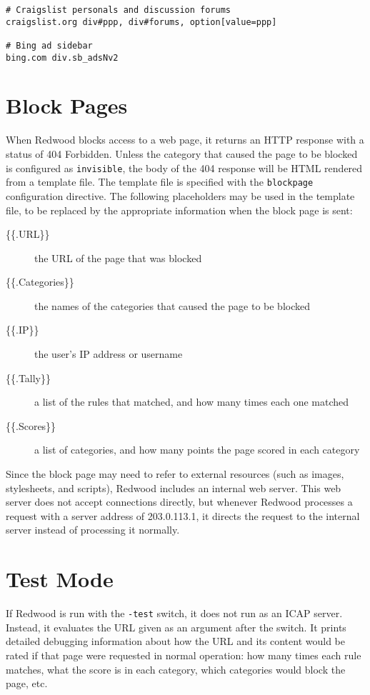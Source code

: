 \documentclass{article}
\begin{document}
\begin{verbatim}
# Craigslist personals and discussion forums
craigslist.org div#ppp, div#forums, option[value=ppp]

# Bing ad sidebar
bing.com div.sb_adsNv2
\end{verbatim}

\section{Block Pages}

When Redwood blocks access to a web page, 
it returns an HTTP response with a status of 404 Forbidden.
Unless the category that caused the page to be blocked is configured as \verb"invisible",
the body of the 404 response will be HTML rendered from a template file.
The template file is specified with the \verb"blockpage" configuration directive.
The following placeholders may be used in the template file, 
to be replaced by the appropriate information when the block page is sent:

\begin{description}

\item[\{\{.URL\}\}] the URL of the page that was blocked
\item[\{\{.Categories\}\}] the names of the categories that caused the page to be blocked
\item[\{\{.IP\}\}] the user's IP address or username
\item[\{\{.Tally\}\}] a list of the rules that matched, and how many times each one matched
\item[\{\{.Scores\}\}] a list of categories, and how many points the page scored in each category

\end{description}

Since the block page may need to refer to external resources
(such as images, stylesheets, and scripts),
Redwood includes an internal web server.
This web server does not accept connections directly,
but whenever Redwood processes a request with a server address of 203.0.113.1,
it directs the request to the internal server instead of processing it normally.

\section{Test Mode}

If Redwood is run with the \verb"-test" switch, it does not run as an ICAP server. 
Instead, it evaluates the URL given as an argument after the switch.
It prints detailed debugging information about how the URL and its content would be rated
if that page were requested in normal operation: how many times each rule matches, 
what the score is in each category, which categories would block the page, etc.
\end{document}
